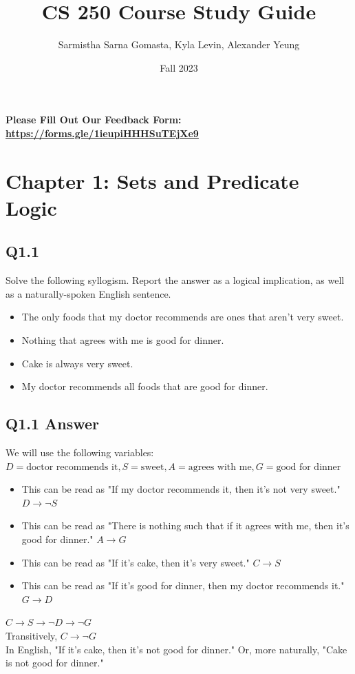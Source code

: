 \documentclass{article}
\title{CS 250 Course Study Guide}
\author{Sarmistha Sarna Gomasta, Kyla Levin, Alexander Yeung}
\date{Fall 2023}
\begin{document}
\maketitle
\begin{center}
    \textbf{Please Fill Out Our Feedback Form: \href{https://forms.gle/1ieupiHHHSuTEjXe9}{https://forms.gle/1ieupiHHHSuTEjXe9}}
\end{center}
\tableofcontents
\newpage
{}
\section*{Chapter 1: Sets and Predicate Logic}
\subsection*{Q1.1}
Solve the following syllogism. Report the answer as a logical implication, as well as a naturally-spoken English sentence.
\begin{itemize}
    \item The only foods that my doctor recommends are ones that aren't very sweet.
    \item Nothing that agrees with me is good for dinner.
    \item Cake is always very sweet.
    \item My doctor recommends all foods that are good for dinner.
\end{itemize}
\newpage
{}
\subsection*{Q1.1 Answer}
We will use the following variables: $D=\text{doctor recommends it},S=\text{sweet},A=\text{agrees with me},G=\text{good for dinner}$
\begin{itemize}
    \item This can be read as "If my doctor recommends it, then it's not very sweet." $D\rightarrow \neg S$
    \item This can be read as "There is nothing such that if it agrees with me, then it's good for dinner." $A\rightarrow G$
    \item This can be read as "If it's cake, then it's very sweet." $C\rightarrow S$
    \item This can be read as "If it's good for dinner, then my doctor recommends it." $G\rightarrow D$
\end{itemize}
$C\rightarrow S\rightarrow \neg D\rightarrow\neg G$
\\ Transitively, $C\rightarrow\neg G$
\\ In English, "If it's cake, then it's not good for dinner." Or, more naturally, "Cake is not good for dinner."
\newpage
{}
\end{document}
